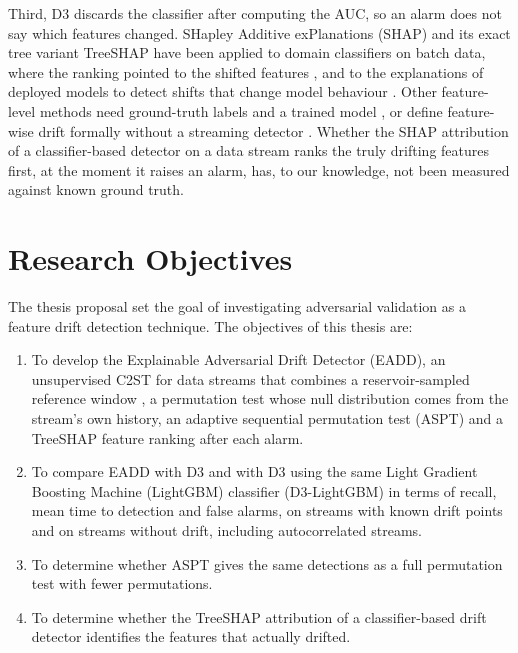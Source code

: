 Third, D3 discards the classifier after computing the AUC, so an alarm does not say which features changed. SHapley Additive exPlanations (SHAP) \citep{Lundberg2017} and its exact tree variant TreeSHAP \citep{LundbergInteraction2020} have been applied to domain classifiers on batch data, where the ranking pointed to the shifted features \citep{Maggio2021}, and to the explanations of deployed models to detect shifts that change model behaviour \citep{Mougan2025}. Other feature-level methods need ground-truth labels and a trained model \citep{TRIPODD2024, HDPD2024}, or define feature-wise drift formally without a streaming detector \citep{HinderFeature2024}. Whether the SHAP attribution of a classifier-based detector on a data stream ranks the truly drifting features first, at the moment it raises an alarm, has, to our knowledge, not been measured against known ground truth.

\section{Research Objectives}
The thesis proposal set the goal of investigating adversarial validation as a feature drift detection technique. The objectives of this thesis are:

\begin{enumerate}
    \item To develop the Explainable Adversarial Drift Detector (EADD), an unsupervised C2ST for data streams that combines a reservoir-sampled reference window \citep{Vitter1985}, a permutation test whose null distribution comes from the stream's own history, an adaptive sequential permutation test (ASPT) and a TreeSHAP feature ranking after each alarm.

    \item To compare EADD with D3 and with D3 using the same Light Gradient Boosting Machine (LightGBM) classifier \citep{Ke2017} (D3-LightGBM) in terms of recall, mean time to detection and false alarms, on streams with known drift points and on streams without drift, including autocorrelated streams.

    \item To determine whether ASPT gives the same detections as a full permutation test with fewer permutations.

    \item To determine whether the TreeSHAP attribution of a classifier-based drift detector identifies the features that actually drifted.
\end{enumerate}

